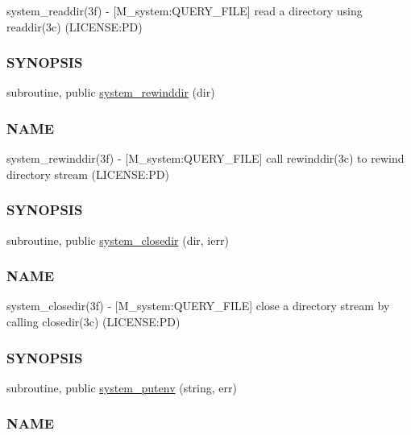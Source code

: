 \begin{DoxyCompactItemize}
\begin{DoxyCompactList}
system\+\_\+readdir(3f) -\/ \mbox{[}M\+\_\+system\+:Q\+U\+E\+R\+Y\+\_\+\+F\+I\+LE\mbox{]} read a directory using readdir(3c) (L\+I\+C\+E\+N\+SE\+:PD) \subsubsection*{S\+Y\+N\+O\+P\+S\+IS}\end{DoxyCompactList}\item 
subroutine, public \mbox{\hyperlink{namespacem__system_a3ffe757195ade8052e8acabd196ee3ca}{system\+\_\+rewinddir}} (dir)
\begin{DoxyCompactList}\small\item\em \subsubsection*{N\+A\+ME}

system\+\_\+rewinddir(3f) -\/ \mbox{[}M\+\_\+system\+:Q\+U\+E\+R\+Y\+\_\+\+F\+I\+LE\mbox{]} call rewinddir(3c) to rewind directory stream (L\+I\+C\+E\+N\+SE\+:PD) \subsubsection*{S\+Y\+N\+O\+P\+S\+IS}\end{DoxyCompactList}\item 
subroutine, public \mbox{\hyperlink{namespacem__system_acd442b52c64fc50482bc08b0ac8a50d1}{system\+\_\+closedir}} (dir, ierr)
\begin{DoxyCompactList}\small\item\em \subsubsection*{N\+A\+ME}

system\+\_\+closedir(3f) -\/ \mbox{[}M\+\_\+system\+:Q\+U\+E\+R\+Y\+\_\+\+F\+I\+LE\mbox{]} close a directory stream by calling closedir(3c) (L\+I\+C\+E\+N\+SE\+:PD) \subsubsection*{S\+Y\+N\+O\+P\+S\+IS}\end{DoxyCompactList}\item 
subroutine, public \mbox{\hyperlink{namespacem__system_af0c9df8e59cac9cd617cd1e20448ea7d}{system\+\_\+putenv}} (string, err)
\begin{DoxyCompactList}\small\item\em \subsubsection*{N\+A\+ME}


\end{DoxyCompactList}
\end{DoxyCompactItemize}
